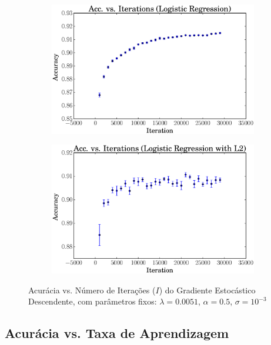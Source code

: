 \documentclass[a4paper, 12pt]{article}
\begin{document}
\begin{figure}[htpb]
\begin{subfigure}[htpb]{0.45\textwidth}
        \includegraphics[width=\textwidth]{acc_vs_iterations_logreg}
        \caption{}
        \label{fig:it_logreg}
    \end{subfigure}
    \begin{subfigure}[htpb]{0.45\textwidth}
        \includegraphics[width=\textwidth]{acc_vs_iterations_logregL2}
        \caption{}
        \label{fig:it_logregL2}
    \end{subfigure}
    \caption{Acurácia vs. Número de Iterações ($I$) do Gradiente Estocástico
    Descendente, com parâmetros fixos: $\lambda=0.0051$, $\alpha=0.5$,
    $\sigma=10^{-3}$}\label{fig:it}
\end{figure}

\newpage
\subsection{Acurácia vs. Taxa de Aprendizagem}
\end{document}
